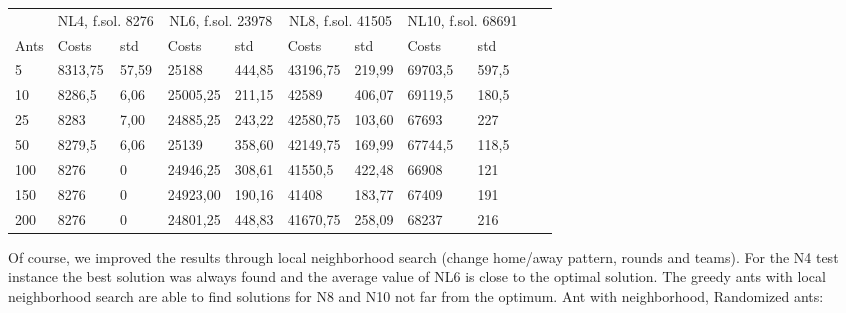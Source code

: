 \begin{minipage}[b]{1.0\textwidth}
    \begin{tabular}{ l | ll | ll | ll | ll | ll}
	\hline
	& \multicolumn{2}{c}{NL4, f.sol. 8276} & \multicolumn{2}{c}{NL6, f.sol. 23978}
	& \multicolumn{2}{c}{NL8, f.sol. 41505} & \multicolumn{2}{c}{NL10, f.sol. 68691} \\
	\cline{1-9}
	Ants & Costs & std & Costs & std & Costs & std & Costs & std \\
	\hline
	5   &  8313,75  & 57,59 &  25188    & 444,85 &  43196,75  & 219,99 &  69703,5  & 597,5 \\
	10  &  8286,5   & 6,06 &  25005,25  & 211,15 &  42589     & 406,07 &  69119,5  & 180,5 \\
	25  &  8283    & 7,00 &  24885,25   & 243,22 &  42580,75  & 103,60 &  67693 	& 227 \\
	50  &  8279,5  & 6,06 &  25139    & 358,60 &  42149,75   & 169,99 &  67744,5    & 118,5 \\
	100 &  8276    & 0 &  24946,25    & 308,61 &  41550,5    & 422,48 &  66908    & 121 \\
	150 &  8276    & 0 &  24923,00    & 190,16 &  41408      & 183,77 &  67409    &
	191 \\ 200 &  8276    & 0 &  24801,25    & 448,83 &  41670,75   & 258,09 &  68237    & 216 \\
	\hline
	\end{tabular}
\end{minipage}
\newline
Of course, we improved the results through local neighborhood search
(change home/away pattern, rounds and teams). For the N4 test instance the best
solution was always found and the average value of NL6 is close to the optimal solution. The greedy ants with local neighborhood search are able to find solutions for N8 and N10 not far from the optimum.
\newline
Ant with neighborhood, Randomized ants:
\newline

